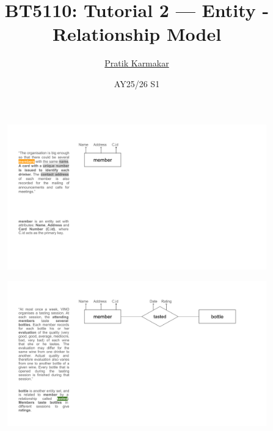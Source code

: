 \documentclass{beamer}
\title{BT5110: Tutorial 2 — Entity - Relationship Model}
\author{\href{https://pratik2358.github.io/}{Pratik Karmakar}}
\institute{School of Computing,\\ National University of Singapore}
\date{AY25/26 S1}
\begin{document}
\begin{frame}
  \titlepage
\end{frame}

\begin{frame}
    \begin{figure}
        \centering
        \includegraphics[width=1.1\linewidth]{tut_02_files/01.pdf}
    \end{figure}
\end{frame}

\begin{frame}
    \begin{figure}
        \centering
        \includegraphics[width=1.1\linewidth]{tut_02_files/02.pdf}
    \end{figure}
\end{frame}
\end{document}
